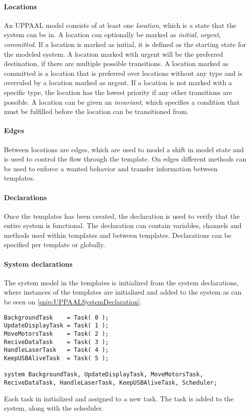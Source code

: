 \paragraph{Locations}
An UPPAAL model consists of at least one \textit{location}, which is a state that the system can be in.
A location can optionally be marked as \textit{initial}, \textit{urgent}, \textit{committed}.
If a location is marked as initial, it is defined as the starting state for the modeled system.
A location marked with urgent will be the preferred destination, if there are multiple possible transitions.
A location marked as committed is a location that is preferred over locations without any type and is overruled by a location marked as urgent.
If a location is not marked with a specific type, the location has the lowest priority if any other transitions are possible.
A location can be given an \textit{invariant}, which specifies a condition that must be fulfilled before the location can be transitioned from.

\paragraph{Edges}
Between locations are edges, which are used to model a shift in model state and is used to control the flow through the template.
On edges different methods can be used to enforce a wanted behavior and transfer information between templates.

\paragraph{Declarations}
Once the templates has been created, the declaration is used to verify that the entire system is functional.
The declaration can contain variables, channels and methods used within templates and between templates.
Declarations can be specified per template or globally.

\paragraph{System declarations}
The system model in the templates is initialized from the system declarations, where instances of the templates are initialized and added to the system as can be seen on \autoref{snip:UPPAALSystemDeclaration}.


\begin{lstlisting}[label={snip:UPPAALSystemDeclaration},caption={System declaration from UPPAAL},frame=tlrb,numbers=none]
BackgroundTask    = Task( 0 );
UpdateDisplayTask = Task( 1 );
MoveMotorsTask    = Task( 2 );
ReciveDataTask    = Task( 3 );
HandleLaserTask   = Task( 4 );
KeepUSBAliveTask  = Task( 5 );

system BackgroundTask, UpdateDisplayTask, MoveMotorsTask, ReciveDataTask, HandleLaserTask, KeepUSBAliveTask, Scheduler;
\end{lstlisting}
Each task in initialized and assigned to a new task.
The task is added to the system, along with the scheduler.

